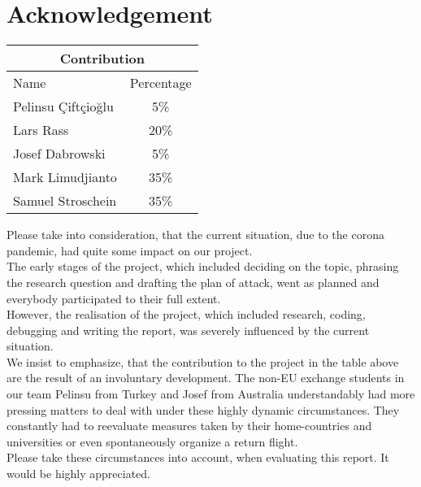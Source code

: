 \section* {Acknowledgement}

\begin{table}[h]
\centering
\begin{tabular}{ |p{3cm}|c|  }
 \hline
 \multicolumn{2}{|c|}{Contribution} \\
 \hline
 \hline
 Name & Percentage\\
 \hline
 Pelinsu Çiftçioğlu & 5\%\\
 Lars Rass & 20\%\\
 Josef Dabrowski & 5\%\\
 Mark Limudjianto & 35\%\\
 Samuel Stroschein & 35\%\\
 \hline
\end{tabular}
\end{table}

Please take into consideration, that the current situation, due to the corona pandemic, had quite some impact on our project. \\
The early stages of the project, which included deciding on the topic, phrasing the research question and drafting the plan of attack, went as planned and everybody participated to their full extent. \\
However, the realisation of the project, which included research, coding, debugging and writing the report, was severely influenced by the current situation. \\
We insist to emphasize, that the contribution to the project in the table above are the result of an involuntary development. The non-EU exchange students in our team Pelinsu from Turkey and Josef from Australia understandably had more pressing matters to deal with under these highly dynamic circumstances. They constantly had to reevaluate measures taken by their home-countries and universities or even spontaneously organize a return flight.\\
Please take these circumstances into account, when evaluating this report. It would be highly appreciated.
